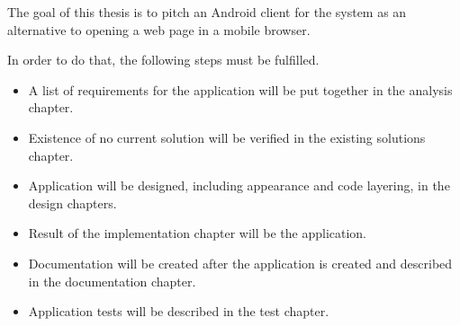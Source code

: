 The goal of this thesis is to pitch an Android client for the \etl{} system as an alternative to opening a web page in a mobile browser.

In order to do that, the following steps must be fulfilled.

\begin{itemize}
    \item A list of requirements for the application will be put together in the analysis chapter.
    \item Existence of no current solution will be verified in the existing solutions chapter.
    \item Application will be designed, including appearance and code layering, in the design chapters.
    \item Result of the implementation chapter will be the application.
    \item Documentation will be created after the application is created and described in the documentation chapter.
    \item Application tests will be described in the test chapter.
\end{itemize}